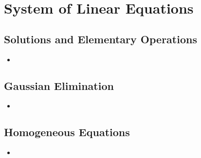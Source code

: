 \chapter{System of Linear Equations}\label{System of Linear Equations}

\section{Solutions and Elementary Operations}\label{Solutions and Elementary Operations}
\begin{itemize}
    \item 
\end{itemize}

\section{Gaussian Elimination}\label{Gaussian Elimination}
\begin{itemize}
    \item 
\end{itemize}

\section{Homogeneous Equations}\label{Homogeneous Equations}
\begin{itemize}
    \item 
\end{itemize}


